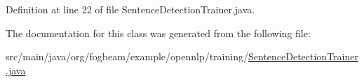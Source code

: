 Definition at line 22 of file Sentence\+Detection\+Trainer.\+java.



The documentation for this class was generated from the following file\+:\begin{DoxyCompactItemize}
\item 
src/main/java/org/fogbeam/example/opennlp/training/\hyperlink{_sentence_detection_trainer_8java}{Sentence\+Detection\+Trainer.\+java}\end{DoxyCompactItemize}
